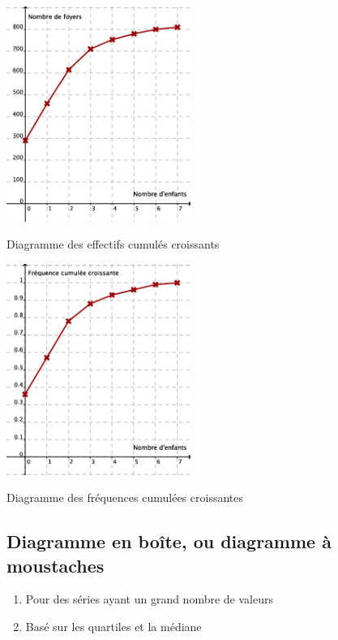 \begin{multicols}{2}
  \begin{center}
    \includegraphics[width=6cm]{Stats_Fig4_DiagEffCum.png}
    
    Diagramme des effectifs cumulés croissants    
  \end{center}

  \columnbreak
  \begin{center}
    \includegraphics[width=6cm]{Stats_Fig4_DiagFreqCum.png}

    Diagramme des fréquences cumulées croissantes
  \end{center}
\end{multicols}



\subsection{Diagramme en boîte, ou diagramme à moustaches}

\begin{enumerate}
\item Pour des séries ayant un grand nombre de valeurs
\item Basé sur les quartiles et la médiane
\end{enumerate}


